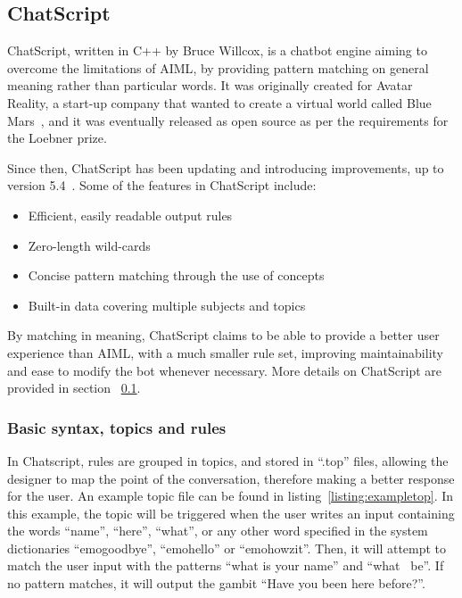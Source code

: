 \subsection{ChatScript}
\label{subsec:chatscript}

ChatScript, written in C++ by Bruce Willcox, is a chatbot engine aiming to overcome the limitations of \ac{AIML}, by providing pattern matching on general meaning rather than particular words. It was originally created for Avatar Reality, a start-up company that wanted to create a virtual world called Blue Mars~\cite{Wilcox2010suzzete}, and it was eventually released as open source as per the requirements for the Loebner prize.

Since then, ChatScript has been updating and introducing improvements, up to version 5.4~\cite{ChatScriptSourceForge}. Some of the features in ChatScript include:
\begin{itemize}
 \item Efficient, easily readable output rules
 \item Zero-length wild-cards
 \item Concise pattern matching through the use of concepts
 \item Built-in data covering multiple subjects and topics
\end{itemize}

By matching in meaning, ChatScript claims to be able to provide a better user experience than \ac{AIML}, with a much smaller rule set, improving maintainability and ease to modify the bot whenever necessary. More details on ChatScript are provided in section ~\ref{subsec:chatscript}.

\subsubsection{Basic syntax, topics and rules}

In Chatscript, rules are grouped in topics, and stored in ``.top'' files, allowing the designer to map the point of the conversation, therefore making a better response for the user. An example topic file can be found in listing~\ref{listing:exampletop}. In this example, the topic will be triggered when the user writes an input containing the words ``name'', ``here'', ``what'', or any other word specified in the system dictionaries ``emogoodbye'', ``emohello'' or ``emohowzit''. Then, it will attempt to match the user input with the patterns ``what is your name'' and ``what ~be''. If no pattern matches, it will output the gambit ``Have you been here before?''.

